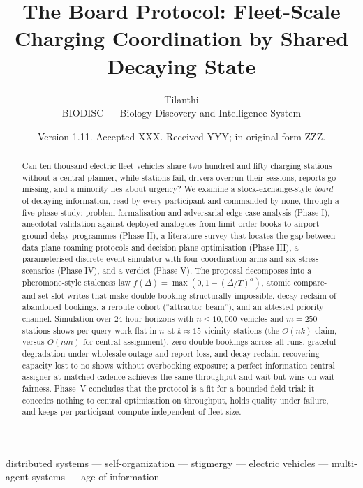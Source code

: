 \documentclass[twoside,twocolumn,usenatbib]{mnras}
\title[The Board Protocol]{The Board Protocol: Fleet-Scale Charging
  Coordination by Shared Decaying State}
\author[Tilanthi]{Tilanthi\\
BIODISC --- Biology Discovery and Intelligence System}
\date{Version 1.11. Accepted XXX. Received YYY; in original form ZZZ.}
\begin{document}
\label{firstpage}
\pagerange{\pageref{firstpage}--\pageref{lastpage}}

\maketitle

\begin{abstract}
Can ten thousand electric fleet vehicles share two hundred and fifty
charging stations without a central planner, while stations fail, drivers
overrun their sessions, reports go missing, and a minority lies about
urgency?  We examine a stock-exchange-style
\emph{board} of decaying information, read by every participant and
commanded by none, through a five-phase study: problem
formalisation and adversarial edge-case analysis (Phase I), anecdotal
validation against deployed analogues from limit order books to
airport ground-delay programmes (Phase II), a literature survey that
locates the gap between data-plane roaming protocols and decision-plane
optimisation (Phase III), a parameterised discrete-event simulator with
four coordination arms and six stress scenarios (Phase IV), and a
verdict (Phase V).  The proposal decomposes into a pheromone-style
staleness law $f(\Delta)=\max(0,1-(\Delta/T)^\alpha)$, atomic
compare-and-set slot writes that make double-booking structurally
impossible, decay-reclaim of abandoned bookings, a reroute cohort
(``attractor beam''), and an attested priority channel.  Simulation over
$24$-hour horizons with $n\le10{,}000$ vehicles and $m=250$ stations
shows per-query work flat in $n$ at $k\approx15$ vicinity stations (the
$O(nk)$ claim, versus $O(nm)$ for central assignment), zero
double-bookings across all runs, graceful degradation under wholesale
outage and report loss, and decay-reclaim recovering capacity lost to
no-shows without overbooking exposure; a perfect-information
central assigner at matched cadence achieves the same throughput and
wait but wins on wait fairness.  Phase~V concludes that the protocol
is a fit for a bounded field trial: it concedes nothing to central
optimisation on throughput, holds quality under failure, and keeps
per-participant compute independent of fleet size.
\end{abstract}

\begin{keywords}
distributed systems --- self-organization --- stigmergy ---
electric vehicles --- multi-agent systems --- age of information
\end{keywords}
\end{document}
